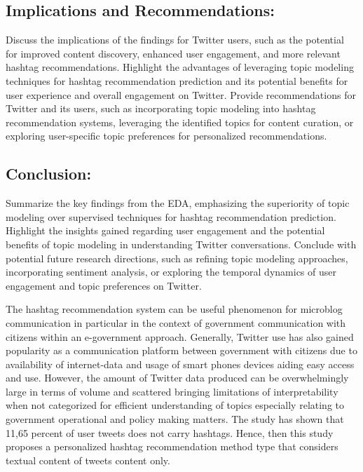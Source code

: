 \subsection{Implications and Recommendations:}
Discuss the implications of the findings for Twitter users, such as the potential for improved content discovery, enhanced user engagement, and more relevant hashtag recommendations.
Highlight the advantages of leveraging topic modeling techniques for hashtag recommendation prediction and its potential benefits for user experience and overall engagement on Twitter.
Provide recommendations for Twitter and its users, such as incorporating topic modeling into hashtag recommendation systems, leveraging the identified topics for content curation, or exploring user-specific topic preferences for personalized recommendations.\\

\subsection{Conclusion:}

Summarize the key findings from the EDA, emphasizing the superiority of topic modeling over supervised techniques for hashtag recommendation prediction.  Highlight the insights gained regarding user engagement and the potential benefits of topic modeling in understanding Twitter conversations.  Conclude with potential future research directions, such as refining topic modeling approaches, incorporating sentiment analysis, or exploring the temporal dynamics of user engagement and topic preferences on Twitter.

The hashtag recommendation system can be useful phenomenon for microblog communication in particular in the context of government communication with citizens within an e-government approach.  Generally, Twitter use has also gained popularity as a communication platform between government with citizens due to availability of internet-data and usage of smart phones devices aiding easy access and use.  However, the amount of Twitter data produced can be overwhelmingly large in terms of volume and scattered bringing limitations of interpretability when not categorized for efficient understanding of topics especially relating to government operational and policy making matters.  The study has shown that 11,65 percent of user tweets does not carry hashtags.  Hence, then this study proposes a personalized hashtag recommendation method type that considers textual content of tweets content only. 


